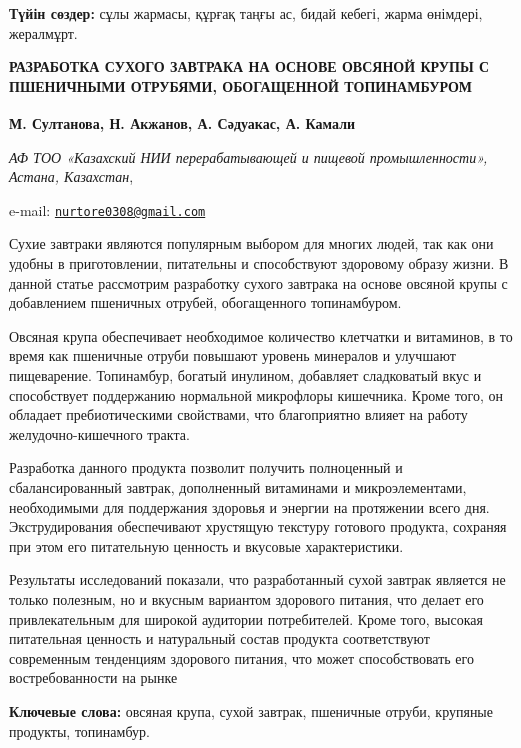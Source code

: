 {\bfseries Түйін сөздер:} сұлы жармасы, құрғақ таңғы ас, бидай кебегі,
жарма өнімдері, жералмұрт.

\begin{articleheader}
{\bfseries РАЗРАБОТКА СУХОГО ЗАВТРАКА НА ОСНОВЕ ОВСЯНОЙ КРУПЫ С ПШЕНИЧНЫМИ ОТРУБЯМИ, ОБОГАЩЕННОЙ ТОПИНАМБУРОМ}

{\bfseries
М. Султанова,
Н. Акжанов\textsuperscript{\envelope },
А. Сәдуакас,
А. Камали}
\end{articleheader}

\begin{affiliation}
\emph{АФ ТОО «Казахский НИИ перерабатывающей и пищевой промышленности», Астана, Казахстан},

e-mail: \href{mailto:nurtore0308@gmail.com}{\nolinkurl{nurtore0308@gmail.com}}
\end{affiliation}

Сухие завтраки являются популярным выбором для многих людей, так как они
удобны в приготовлении, питательны и способствуют здоровому образу
жизни. В данной статье рассмотрим разработку сухого завтрака на основе
овсяной крупы с добавлением пшеничных отрубей, обогащенного
топинамбуром.

Овсяная крупа обеспечивает необходимое количество клетчатки и витаминов,
в то время как пшеничные отруби повышают уровень минералов и улучшают
пищеварение. Топинамбур, богатый инулином, добавляет сладковатый вкус и
способствует поддержанию нормальной микрофлоры кишечника. Кроме того, он
обладает пребиотическими свойствами, что благоприятно влияет на работу
желудочно-кишечного тракта.

Разработка данного продукта позволит получить полноценный и
сбалансированный завтрак, дополненный витаминами и микроэлементами,
необходимыми для поддержания здоровья и энергии на протяжении всего дня.
Экструдирования обеспечивают хрустящую текстуру готового продукта,
сохраняя при этом его питательную ценность и вкусовые характеристики.

Результаты исследований показали, что разработанный сухой завтрак
является не только полезным, но и вкусным вариантом здорового питания,
что делает его привлекательным для широкой аудитории потребителей. Кроме
того, высокая питательная ценность и натуральный состав продукта
соответствуют современным тенденциям здорового питания, что может
способствовать его востребованности на рынке

{\bfseries Ключевые слова:} овсяная крупа, сухой завтрак, пшеничные отруби,
крупяные продукты, топинамбур.

